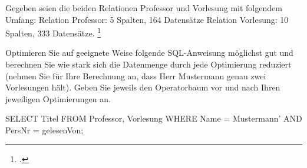 \documentclass{bschlangaul-aufgabe}
\begin{document}

Gegeben seien die beiden Relationen Professor und Vorlesung mit folgendem Umfang:
Relation Professor: 5 Spalten, 164 Datensätze
Relation Vorlesung: 10 Spalten, 333 Datensätze.
\footcite{examen:66116:2019:09}

Optimieren Sie auf geeignete Weise folgende SQL-Anweisung möglichst gut und berechnen Sie wie
stark sich die Datenmenge durch jede Optimierung reduziert (nehmen Sie für Ihre Berechnung an, dass
Herr Mustermann genau zwei Vorlesungen hält). Geben Sie jeweils den Operatorbaum vor und nach
Ihren jeweiligen Optimierungen an.

SELECT Titel FROM Professor, Vorlesung WHERE Name = Mustermann’ AND PersNr =
gelesenVon;
\end{document}
